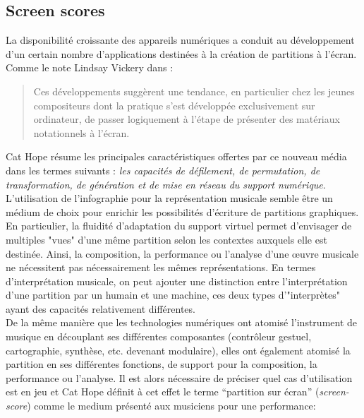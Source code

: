 \subsection{Screen scores}

\noindent La disponibilité croissante des appareils numériques a conduit au développement d'un certain nombre d'applications destinées à la création de partitions à l'écran. Comme le note Lindsay Vickery dans \cite{vickery_limitations_2014} :

\begin{quotation}
Ces développements suggèrent une tendance, en particulier chez les jeunes compositeurs dont la pratique s'est développée exclusivement sur ordinateur, de passer logiquement à l'étape de présenter des matériaux notationnels à l'écran.
\end{quotation}

Cat Hope résume les principales caractéristiques offertes par ce nouveau média dans les termes suivants \cite{hope_screen_2011}: \textit{les capacités de défilement, de permutation, de transformation, de génération et de mise en réseau du support numérique}.\\
\indent L'utilisation de l'infographie pour la représentation musicale semble être un médium de choix pour enrichir les possibilités d'écriture de partitions graphiques. En particulier, la fluidité d'adaptation du support virtuel permet d'envisager de multiples "vues" d'une même partition selon les contextes auxquels elle est destinée. Ainsi, la composition, la performance ou l'analyse d'une œuvre musicale ne nécessitent pas nécessairement les mêmes représentations. En termes d'interprétation musicale, on peut ajouter une distinction entre l'interprétation d'une partition par un humain et une machine, ces deux types d'"interprètes" ayant des capacités relativement différentes.\\
\indent De la même manière que les technologies numériques ont atomisé l'instrument de musique en découplant ses différentes composantes (contrôleur gestuel, cartographie, synthèse, etc. devenant modulaire), elles ont également atomisé la partition en ses différentes fonctions, de support pour la composition, la performance ou l'analyse. Il est alors nécessaire de préciser quel cas d'utilisation est en jeu et Cat Hope définit à cet effet le terme ``partition sur écran'' (\textit{screen-score}) \cite{hope_screen_2011} comme le medium présenté aux musiciens pour une performance:

